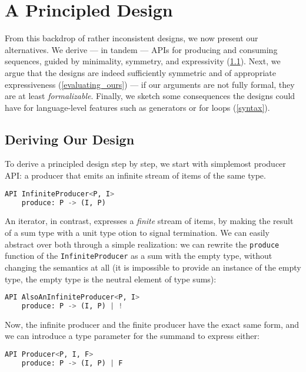 \documentclass[sigplan,screen,10pt,anonymous,review]{acmart}
\begin{document}


\section{A Principled Design}\label{main_design}

From this backdrop of rather inconsistent designs, we now present our alternatives. We derive --- in tandem --- APIs for producing and consuming sequences, guided by minimality, symmetry, and expressivity (\cref{derive}). Next, we argue that the designs are indeed sufficiently symmetric and of appropriate expressiveness (\cref{evaluating_ours}) --- if our arguments are not fully formal, they are at least \textit{formalizable}. Finally, we sketch some consequences the designs could have for language-level features such as generators or for loops (\cref{syntax}).

\subsection{Deriving Our Design}\label{derive}

To derive a principled design step by step, we start with simplemost producer API: a producer that emits an infinite stream of items of the same type.

\begin{lstlisting}[language=Python]
API InfiniteProducer<P, I>
    produce: P -> (I, P)
\end{lstlisting}

An iterator, in contrast, expresses a \textit{finite} stream of items, by making the result of a sum type with a unit type otion to signal termination. We can easily abstract over both through a simple realization: we can rewrite the \texttt{produce} function of the \texttt{InfiniteProducer} as a sum with the empty type, without changing the semantics at all (it is impossible to provide an instance of the empty type, the empty type is the neutral element of type sums):

\begin{lstlisting}[language=Python]
API AlsoAnInfiniteProducer<P, I>
    produce: P -> (I, P) | !
\end{lstlisting}

Now, the infinite producer and the finite producer have the exact same form, and we can introduce a type parameter for the summand to express either:

\begin{lstlisting}[language=Python]
API Producer<P, I, F>
    produce: P -> (I, P) | F
\end{lstlisting}
\end{document}
